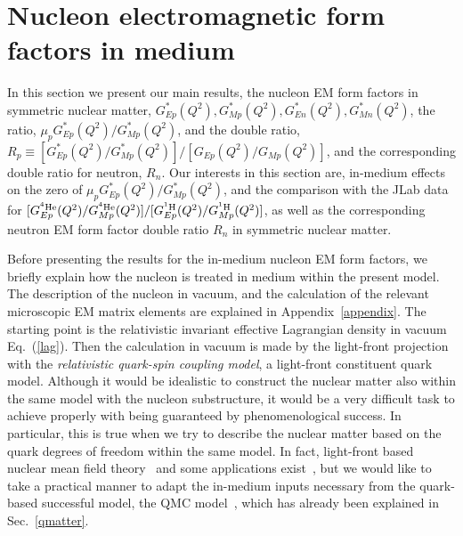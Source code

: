 \documentclass[preprint,aps,showpacs,floatfix]{revtex4}
\begin{document}
\section{Nucleon electromagnetic form factors in medium}
\label{mediumffs}

In this section we present our main results, the nucleon EM form factors 
in symmetric nuclear matter, $G^*_{Ep}(Q^2), G^*_{Mp}(Q^2), G^*_{En}(Q^2), G^*_{Mn}(Q^2)$, 
the ratio, $\mu_p G^*_{Ep}(Q^2)/G^*_{Mp}(Q^2)$, and the double ratio, 
$R_p \equiv [G^*_{Ep}(Q^2)/G^*_{Mp}(Q^2)]/[G_{Ep}(Q^2)/G_{Mp}(Q^2)]$, 
and the corresponding double ratio for neutron, $R_n$.
Our interests in this section are, in-medium effects on the zero of 
$\mu_p G^*_{Ep}(Q^2)/G^*_{Mp}(Q^2)$, 
and the comparison with the JLab data for   
$[G^{^4\rm He}_{Ep}(Q^2)/G^{^4\rm He}_{Mp}(Q^2)]/[G^{^1\rm H}_{Ep}(Q^2)/G^{^1\rm H}_{Mp}(Q^2)]$, 
as well as the corresponding neutron EM form factor double ratio $R_n$ 
in symmetric nuclear matter.

Before presenting the results for the in-medium nucleon EM 
form factors, we briefly explain how the nucleon is treated 
in medium within the present model. The description of the nucleon in vacuum, 
and the calculation of the relevant microscopic EM matrix elements 
are explained in Appendix~\ref{appendix}. 
The starting point is the relativistic invariant effective Lagrangian density in vacuum 
Eq.~(\ref{lag}). Then the calculation in vacuum is made by the light-front 
projection with the {\it relativistic quark-spin coupling model}, 
a light-front constituent quark model. 
Although it would be idealistic to construct the nuclear matter 
also within the same model with the nucleon substructure, 
it would be a very difficult task to achieve properly with being guaranteed 
by phenomenological success. 
In particular, this is true when we try to describe the nuclear matter 
based on the quark degrees of freedom within the same model.
In fact, light-front based nuclear mean field theory~\cite{LFNMean} 
and some applications exist~\cite{LFEMC},  
but we would like to take a practical 
manner to adapt the in-medium inputs necessary from the 
quark-based successful model, the QMC model~\cite{QMCreview,QMCfinite}, 
which has already been explained in Sec.~\ref{qmatter}. 
\end{document}
